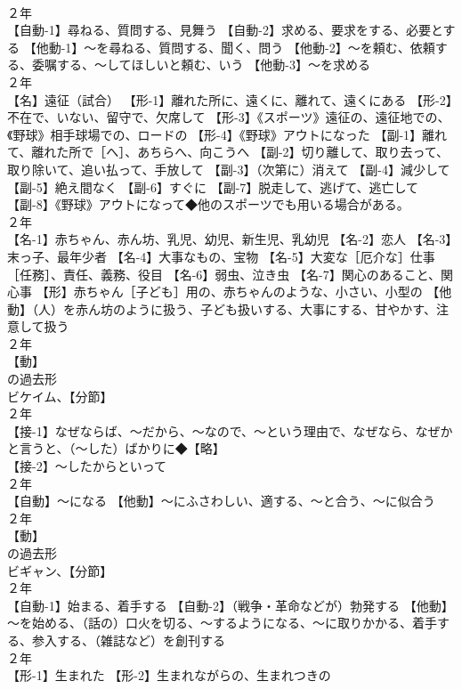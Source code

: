 \documentclass[8pt]{extreport}
\begin{document}
\begin{CJK}{UTF8}{min}
\\	２年	
\\	【自動-1】尋ねる、質問する、見舞う 【自動-2】求める、要求をする、必要とする 【他動-1】～を尋ねる、質問する、聞く、問う 【他動-2】～を頼む、依頼する、委嘱する、～してほしいと頼む、いう 【他動-3】～を求める
\\	２年	
\\	【名】遠征（試合） 【形-1】離れた所に、遠くに、離れて、遠くにある 【形-2】不在で、いない、留守で、欠席して 【形-3】《スポーツ》遠征の、遠征地での、《野球》相手球場での、ロードの 【形-4】《野球》アウトになった 【副-1】離れて、離れた所で［へ］、あちらへ、向こうへ 【副-2】切り離して、取り去って、取り除いて、追い払って、手放して 【副-3】（次第に）消えて 【副-4】減少して 【副-5】絶え間なく 【副-6】すぐに 【副-7】脱走して、逃げて、逃亡して 【副-8】《野球》アウトになって◆他のスポーツでも用いる場合がある。
\\	２年	
\\	【名-1】赤ちゃん、赤ん坊、乳児、幼児、新生児、乳幼児 【名-2】恋人 【名-3】末っ子、最年少者 【名-4】大事なもの、宝物 【名-5】大変な［厄介な］仕事［任務］、責任、義務、役目 【名-6】弱虫、泣き虫 【名-7】関心のあること、関心事 【形】赤ちゃん［子ども］用の、赤ちゃんのような、小さい、小型の 【他動】（人）を赤ん坊のように扱う、子ども扱いする、大事にする、甘やかす、注意して扱う
\\	２年	
\\	【動】
\\	の過去形 
\\	ビケイム、【分節】
\\	２年	
\\	【接-1】なぜならば、～だから、～なので、～という理由で、なぜなら、なぜかと言うと、（～した）ばかりに◆【略】
\\	【接-2】～したからといって
\\	２年	
\\	【自動】～になる 【他動】～にふさわしい、適する、～と合う、～に似合う
\\	２年	
\\	【動】
\\	の過去形 
\\	ビギャン、【分節】
\\	２年	
\\	【自動-1】始まる、着手する 【自動-2】（戦争・革命などが）勃発する 【他動】～を始める、（話の）口火を切る、～するようになる、～に取りかかる、着手する、参入する、（雑誌など）を創刊する
\\	２年	
\\	【形-1】生まれた 【形-2】生まれながらの、生まれつきの

\end{CJK}
\end{document}
